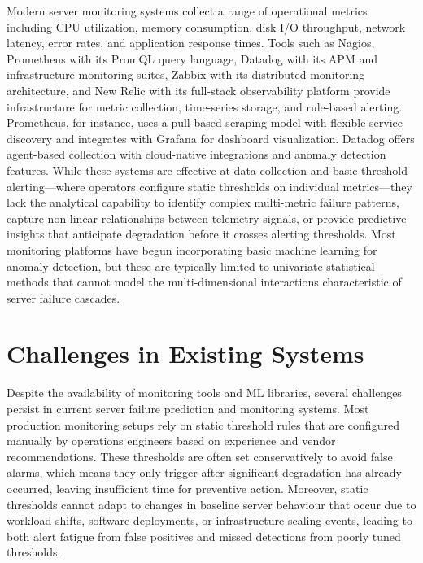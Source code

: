 \documentclass[12pt,letterpaper]{report}
\begin{document}
Modern server monitoring systems collect a range of operational metrics including CPU utilization, memory consumption, disk I/O throughput, network latency, error rates, and application response times. Tools such as Nagios, Prometheus with its PromQL query language, Datadog with its APM and infrastructure monitoring suites, Zabbix with its distributed monitoring architecture, and New Relic with its full-stack observability platform provide infrastructure for metric collection, time-series storage, and rule-based alerting. Prometheus, for instance, uses a pull-based scraping model with flexible service discovery and integrates with Grafana for dashboard visualization. Datadog offers agent-based collection with cloud-native integrations and anomaly detection features. While these systems are effective at data collection and basic threshold alerting---where operators configure static thresholds on individual metrics---they lack the analytical capability to identify complex multi-metric failure patterns, capture non-linear relationships between telemetry signals, or provide predictive insights that anticipate degradation before it crosses alerting thresholds. Most monitoring platforms have begun incorporating basic machine learning for anomaly detection, but these are typically limited to univariate statistical methods that cannot model the multi-dimensional interactions characteristic of server failure cascades.

\section{Challenges in Existing Systems}

Despite the availability of monitoring tools and ML libraries, several challenges persist in current server failure prediction and monitoring systems. Most production monitoring setups rely on static threshold rules that are configured manually by operations engineers based on experience and vendor recommendations. These thresholds are often set conservatively to avoid false alarms, which means they only trigger after significant degradation has already occurred, leaving insufficient time for preventive action. Moreover, static thresholds cannot adapt to changes in baseline server behaviour that occur due to workload shifts, software deployments, or infrastructure scaling events, leading to both alert fatigue from false positives and missed detections from poorly tuned thresholds.
\end{document}

